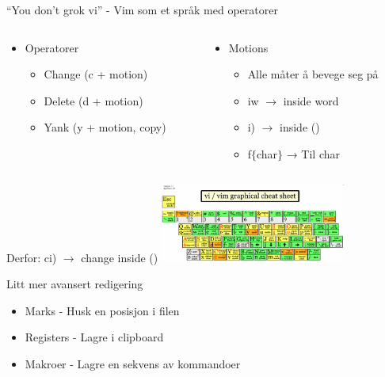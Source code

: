 \documentclass{beamer}
\begin{document}
\begin{frame}{``You don't grok vi'' - Vim som et språk med operatorer}
	\begin{center}
		\begin{columns}
			\begin{column}{0.5\textwidth}
				\begin{itemize}
					\item Operatorer
					      \begin{itemize}
						      \item Change (c + motion)
						      \item Delete (d + motion)
						      \item Yank (y + motion, copy)
					      \end{itemize}
				\end{itemize}
			\end{column}
			\begin{column}{0.5\textwidth}
				\begin{itemize}
					\item Motions
					      \begin{itemize}
						      \item Alle måter å bevege seg på
						      \item iw $\rightarrow$ inside word
						      \item i) $\rightarrow$ inside ()
                              \item f$\{$char$\}$ → Til char
					      \end{itemize}
				\end{itemize}
			\end{column}
		\end{columns}
		\vspace{20px}
		Derfor: ci) $\rightarrow$ change inside ()
		{\includegraphics[width=230px]{images/vim-cheat-sheet.png}}
	\end{center}
\end{frame}

\begin{frame}{Litt mer avansert redigering}
    \begin{itemize}
        \item Marks - Husk en posisjon i filen
        \item Registers - Lagre i clipboard
        \item Makroer - Lagre en sekvens av kommandoer
    \end{itemize}
\end{frame}
\end{document}
